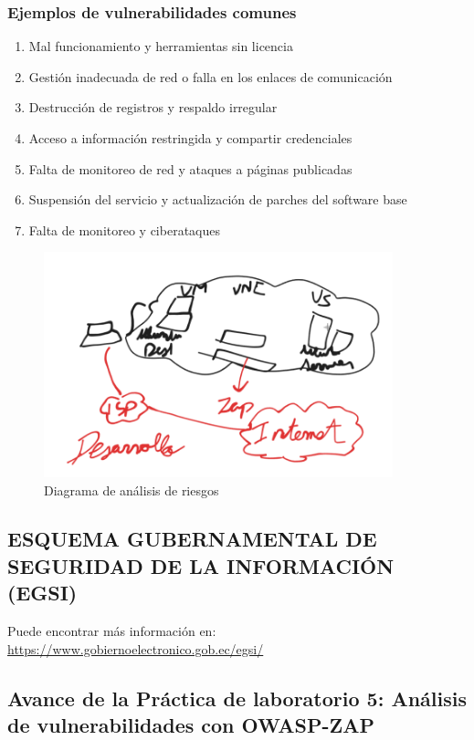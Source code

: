 \documentclass[12pt,a4paper]{article}
\begin{document}
\subsubsection{Ejemplos de vulnerabilidades comunes}
\begin{enumerate}
    \item Mal funcionamiento y herramientas sin licencia
    \item Gestión inadecuada de red o falla en los enlaces de comunicación
    \item Destrucción de registros y respaldo irregular
    \item Acceso a información restringida y compartir credenciales
    \item Falta de monitoreo de red y ataques a páginas publicadas
    \item Suspensión del servicio y actualización de parches del software base
    \item Falta de monitoreo y ciberataques
\end{enumerate}

\begin{figure}[H]
\centering
\includegraphics[width=0.9\textwidth]{dibujo_practica.png}
\caption{Diagrama de análisis de riesgos}
\label{fig:dibujo_practica}
\end{figure}

\subsection{ESQUEMA GUBERNAMENTAL DE SEGURIDAD DE LA INFORMACIÓN (EGSI)}

Puede encontrar más información en: \url{https://www.gobiernoelectronico.gob.ec/egsi/}

\subsection{Avance de la Práctica de laboratorio 5: Análisis de vulnerabilidades con OWASP-ZAP}
\end{document}
